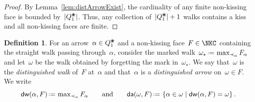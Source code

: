\documentclass{amsart}
\theoremstyle{definition}
\newtheorem{definition}[theorem]{Definition}
\newcommand{\set}[2]{\left\{ #1 \;\middle|\; #2 \right\}} %
\newcommand{\eqdef}{\mbox{\,\raisebox{0.2ex}{\scriptsize\ensuremath{\mathrm:}}\ensuremath{=}\,}} %
\newcommand{\darkblue}{\color{darkblue}} %
\newcommand{\defn}[1]{\textsl{\darkblue #1}} %
\newcommand{\blossom}{^\text{\ding{96}}} %
\newcommand{\distinguishedWalk}[2]{\mathsf{dw}(#1,#2)} %
\newcommand{\distinguishedArrows}[2]{\mathsf{da}(#1,#2)} %
\begin{document}
\begin{proof}
By Lemma~\ref{lem:distArrowExist}, the cardinality of any finite non-kissing face is bounded by~$|Q_1\blossom|$.
Thus, any collection of~$|Q_1\blossom|+1$ walks contains a kiss and all non-kissing faces are finite.
\end{proof}

\begin{definition}
For an arrow~$\alpha \in Q\blossom_1$ and a non-kissing face~$F \in \NKC$ containing the straight walk passing through~$\alpha$, consider the marked walk~$\omega_\star \eqdef \max_{\prec_\alpha} F_\alpha$ and let~$\omega$ be the walk obtained by forgetting the mark in~$\omega_\star$. We say that~$\omega$ is the \defn{distinguished walk} of~$F$ at~$\alpha$ and that~$\alpha$ is a \defn{distinguished arrow} on~$\omega \in F$.
We write
\[
\distinguishedWalk{\alpha}{F} \eqdef \max\nolimits_{\prec_\alpha} F_\alpha
\qquad\text{and}\qquad
\distinguishedArrows{\omega}{F} \eqdef \set{\alpha \in \omega}{\distinguishedWalk{\alpha}{F} = \omega}.
\]
\end{definition}
\end{document}
